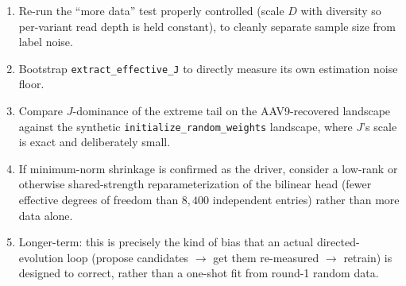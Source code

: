 \documentclass[11pt]{article}
\newcommand{\code}[1]{\texttt{#1}}
\begin{document}
\begin{enumerate}
  \item Re-run the ``more data'' test properly controlled (scale $D$ with diversity so per-variant
        read depth is held constant), to cleanly separate sample size from label noise.
  \item Bootstrap \code{extract\_effective\_J} to directly measure its own estimation noise floor.
  \item Compare $J$-dominance of the extreme tail on the AAV9-recovered landscape against the
        synthetic \code{initialize\_random\_weights} landscape, where $J$'s scale is exact and
        deliberately small.
  \item If minimum-norm shrinkage is confirmed as the driver, consider a low-rank or otherwise
        shared-strength reparameterization of the bilinear head (fewer effective degrees of freedom
        than $8{,}400$ independent entries) rather than more data alone.
  \item Longer-term: this is precisely the kind of bias that an actual directed-evolution loop
        (propose candidates $\to$ get them re-measured $\to$ retrain) is designed to correct, rather
        than a one-shot fit from round-1 random data.
\end{enumerate}
\end{document}
